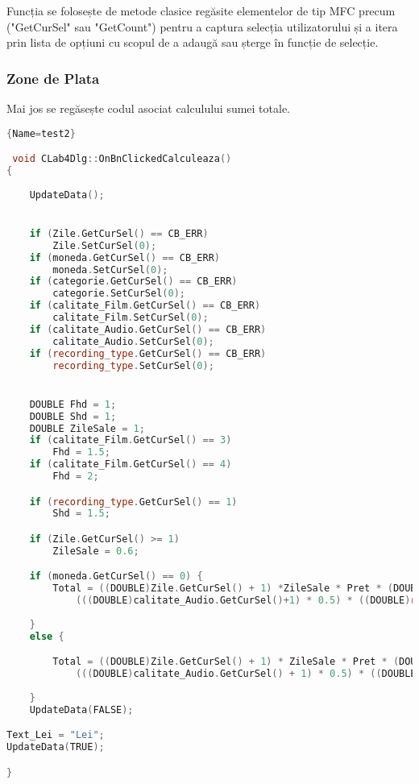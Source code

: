\documentclass{amsart}
\begin{document}
\hfill \newline


	Funcția se folosește de metode clasice regăsite elementelor de tip MFC precum ("GetCurSel" sau "GetCount") pentru a captura selecția utilizatorului și a itera prin lista de opțiuni cu scopul de a adaugă sau șterge în funcție de selecție. 
 \hfill \newline


\newpage

\subsubsection{\textbf{Zone de Plata}}\hfill

\hfill \newline
\hfill \newline

Mai jos se regăsește codul asociat calculului sumei totale.

\hfill \newline


 \begin{lstlisting}[language=C++]{Name=test2}

 void CLab4Dlg::OnBnClickedCalculeaza()
{
	
	UpdateData();


	if (Zile.GetCurSel() == CB_ERR)
		Zile.SetCurSel(0);
	if (moneda.GetCurSel() == CB_ERR)
		moneda.SetCurSel(0);
	if (categorie.GetCurSel() == CB_ERR)
		categorie.SetCurSel(0);
	if (calitate_Film.GetCurSel() == CB_ERR)
		calitate_Film.SetCurSel(0);
	if (calitate_Audio.GetCurSel() == CB_ERR)
		calitate_Audio.SetCurSel(0);
	if (recording_type.GetCurSel() == CB_ERR)
		recording_type.SetCurSel(0);


	DOUBLE Fhd = 1;
	DOUBLE Shd = 1;
	DOUBLE ZileSale = 1;
	if (calitate_Film.GetCurSel() == 3)
		Fhd = 1.5; 
	if (calitate_Film.GetCurSel() == 4)
		Fhd = 2;

	if (recording_type.GetCurSel() == 1)
		Shd = 1.5;

	if (Zile.GetCurSel() >= 1)
		ZileSale = 0.6;

	if (moneda.GetCurSel() == 0) {
		Total = ((DOUBLE)Zile.GetCurSel() + 1) *ZileSale * Pret * (DOUBLE)Lista.GetSelCount() * ( ((DOUBLE)calitate_Film.GetCurSel()+1) * 0.34) * Fhd *
			(((DOUBLE)calitate_Audio.GetCurSel()+1) * 0.5) * ((DOUBLE)recording_type.GetCurSel()+1) * Shd  * (Reducere ? 0.75 : 1);
		
	}
	else {

		Total = ((DOUBLE)Zile.GetCurSel() + 1) * ZileSale * Pret * (DOUBLE)Lista.GetSelCount() * (((DOUBLE)calitate_Film.GetCurSel() + 1) * 0.34) * Fhd *
			(((DOUBLE)calitate_Audio.GetCurSel() + 1) * 0.5) * ((DOUBLE)recording_type.GetCurSel() + 1) * Shd * (Reducere ? 0.75 : 1) * 4.92;
		
	}
	UpdateData(FALSE);

Text_Lei = "Lei";
UpdateData(TRUE);

}

 \end{lstlisting}
\end{document}

